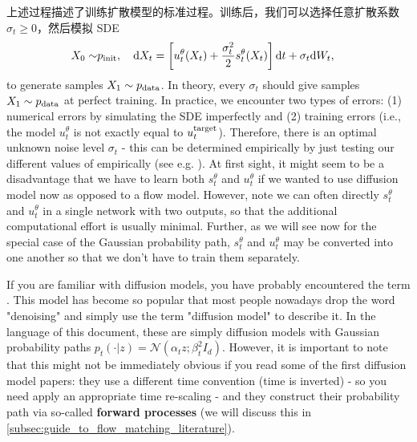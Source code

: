 上述过程描述了训练扩散模型的标准过程。训练后，我们可以选择任意扩散系数 $\sigma_t\geq 0$，然后模拟 SDE
\begin{align}
\label{eq:sde_extension_restated}
    X_0\sim&p_{\rm{init}},\quad \mathrm{d} X_t =\left[u_t^\theta(X_t)+\frac{\sigma_t^2}{2}s_t^\theta(X_t)\right]\mathrm{d} t +\sigma_t\mathrm{d} W_t,
\end{align}
to generate samples $X_1\sim p_{\rm{data}}$. In theory, every $\sigma_t$ should give samples $X_1\sim p_{\rm{data}}$ at perfect training. In practice, we encounter two types of errors: (1) numerical errors by simulating the SDE imperfectly and (2) training errors (i.e., the model $u_t^{\theta}$ is not exactly equal to $u^{\text{target}}_t$). Therefore, there is an optimal unknown noise level $\sigma_t$ - this can be determined empirically by just testing our different values of empirically (see e.g. \citep{albergo2023stochastic,karras2022elucidating,ma2024sit}). At first sight, it might seem to be a disadvantage that we have to learn both $s_t^\theta$ and $u_t^\theta$ if we wanted to use diffusion model now as opposed to a flow model. However, note we can often directly $s_t^\theta$ and $u_t^\theta$ in a single network with two outputs, so that the additional computational effort is usually minimal. Further, as we will see now for the special case of the Gaussian probability path, $s_t^\theta$ and $u_t^\theta$ may be converted into one another so that we don't have to train them separately.

\begin{remarkbox}If you are familiar with diffusion models, you have probably encountered the term . This model has become so popular that most people nowadays drop the word "denoising" and simply use the term "diffusion model" to describe it. In the language of this document, these are simply diffusion models with Gaussian probability paths $p_t(\cdot|z)=\mathcal{N}(\alpha_t z;\beta_t^2 I_d)$. However, it is important to note that this might not be immediately obvious if you read some of the first diffusion model papers: they use a different time convention (time is inverted) - so you need apply an appropriate time re-scaling - and they construct their probability path via so-called \textbf{forward processes} (we will discuss this in \cref{subsec:guide_to_flow_matching_literature}).
\end{remarkbox}

